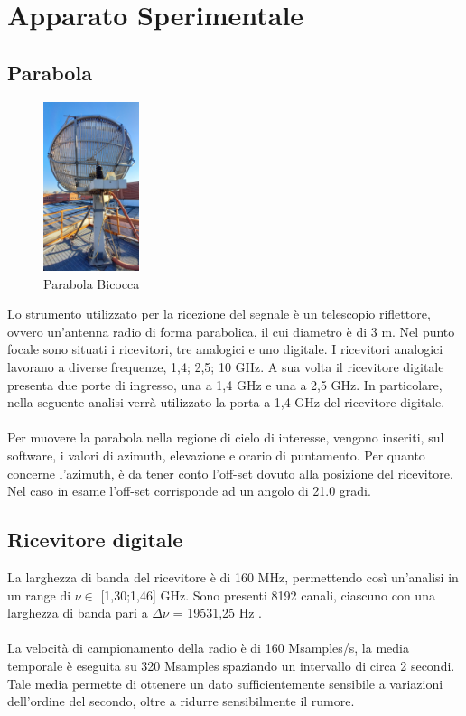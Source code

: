 \section{Apparato Sperimentale}



\subsection{Parabola}

\begin{figure}
    \centering
    \includegraphics[width=0.25\textwidth]{Parabola.png}
    \caption{Parabola Bicocca}
\end{figure}

Lo strumento utilizzato per la ricezione del segnale è un telescopio riflettore, ovvero un'antenna radio di forma parabolica, il cui diametro è di 3 m. Nel punto focale sono situati i ricevitori, tre analogici e uno digitale.
I ricevitori analogici lavorano a diverse frequenze, 1,4; 2,5; 10 GHz. A sua volta il ricevitore digitale presenta due porte di ingresso, una a 1,4 GHz e una a 2,5 GHz.
In particolare, nella seguente analisi verrà utilizzato la porta a 1,4 GHz del ricevitore digitale.
\\\\
Per muovere la parabola nella regione di cielo di interesse, vengono inseriti, sul software, i valori di azimuth, elevazione e orario di puntamento. Per quanto concerne l'azimuth, è da tener conto l'off-set dovuto alla posizione del ricevitore. Nel caso in esame l'off-set corrisponde ad un angolo di 21.0 gradi. 

\subsection{Ricevitore digitale}
La larghezza di banda del ricevitore è di 160 MHz, permettendo così un'analisi in un range di $\nu \in$  [1,30;1,46] GHz. Sono presenti 8192 canali, ciascuno con una larghezza di banda pari a $\Delta\nu$ = 19531,25 Hz \cite{Canali:canali}.%
\\\\
La velocità di campionamento della radio è di 160 Msamples/s, la media temporale è eseguita su 320 Msamples spaziando un intervallo di circa 2 secondi. Tale media permette di ottenere un dato sufficientemente sensibile a variazioni dell'ordine del secondo, oltre a ridurre sensibilmente il rumore. 


